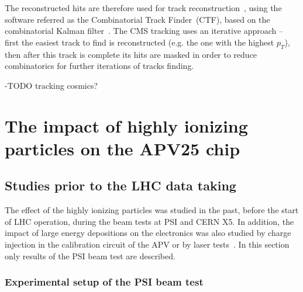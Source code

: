 The reconstructed hits are therefore used for track reconstruction~\cite{Chatrchyan:2014fea}, using the software referred as the Combinatorial Track Finder~(CTF), based on the combinatorial Kalman filter~\cite{Fruhwirth:1987fm}. The CMS tracking uses an iterative approach -- first the easiest track to find is reconstructed (e.g. the one with the highest $p_{T}$), then after this track is complete its hits are masked in order to reduce combinatorics for further iterations of tracks finding.



-TODO tracking cosmics?

\section{The impact of highly ionizing particles on the APV25 chip}



\subsection{Studies prior to the LHC data taking~\label{sec:HIPinPast}}

The effect of the highly ionizing particles was studied in the past, before the start of LHC operation, during the beam tests at PSI and CERN X5. In addition, the impact of large energy depositions on the electronics was also studied by charge injection in the calibration circuit of the APV or by laser tests~\cite{Adam:2005pz}. In this section only results of the PSI beam test are described.

\subsubsection{Experimental setup of the PSI beam test}

